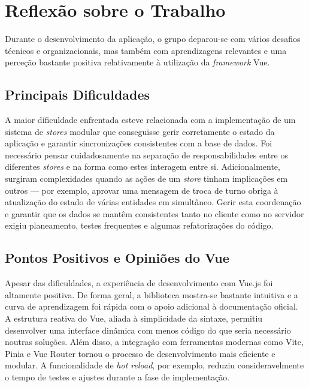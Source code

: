 \documentclass{article}
\begin{document}
\newpage
\section{Reflexão sobre o Trabalho}

Durante o desenvolvimento da aplicação, o grupo deparou-se com vários desafios técnicos e organizacionais, mas também com aprendizagens relevantes e uma perceção bastante positiva relativamente à utilização da \textit{framework} Vue.

\subsection*{Principais Dificuldades}

A maior dificuldade enfrentada esteve relacionada com a implementação de um sistema de \textit{stores} modular que conseguisse gerir corretamente o estado da aplicação e garantir sincronizações consistentes com a base de dados. Foi necessário pensar cuidadosamente na separação de responsabilidades entre os diferentes \textit{stores} e na forma como estes interagem entre si.
Adicionalmente, surgiram complexidades quando as ações de um \textit{store} tinham implicações em outros — por exemplo, aprovar uma mensagem de troca de turno obriga à atualização do estado de várias entidades em simultâneo. Gerir esta coordenação e garantir que os dados se mantêm consistentes tanto no cliente como no servidor exigiu planeamento, testes frequentes e algumas refatorizações do código.

\subsection*{Pontos Positivos e Opiniões do Vue}

Apesar das dificuldades, a experiência de desenvolvimento com Vue.js foi altamente positiva. De forma geral, a biblioteca mostra-se bastante intuitiva e a curva de aprendizagem foi rápida com o apoio adicional à documentação oficial.\newline
A estrutura reativa do Vue, aliada à simplicidade da sintaxe, permitiu desenvolver uma interface dinâmica com menos código do que seria necessário noutras soluções.\newline
Além disso, a integração com ferramentas modernas como Vite, Pinia e Vue Router tornou o processo de desenvolvimento mais eficiente e modular. A funcionalidade de \textit{hot reload}, por exemplo, reduziu consideravelmente o tempo de testes e ajustes durante a fase de implementação.\newline
\end{document}
